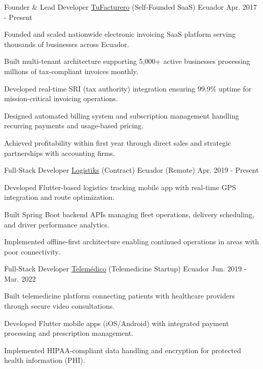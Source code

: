 \begin{cventries}
  \cventry
    {Founder \& Lead Developer} %
    {\href{https://tufacturero.ec}{TuFacturero} (Self-Founded SaaS)} %
    {Ecuador} %
    {Apr. 2017 - Present} %
    {
      \begin{cvitems} %
        \item {Founded and scaled nationwide electronic invoicing SaaS platform serving thousands of businesses across Ecuador.}
        \item {Built multi-tenant architecture supporting 5,000+ active businesses processing millions of tax-compliant invoices monthly.}
        \item {Developed real-time SRI (tax authority) integration ensuring 99.9\% uptime for mission-critical invoicing operations.}
        \item {Designed automated billing system and subscription management handling recurring payments and usage-based pricing.}
        \item {Achieved profitability within first year through direct sales and strategic partnerships with accounting firms.}
      \end{cvitems}
    }

  \cventry
    {Full-Stack Developer} %
    {\href{https://logistiksusa.com/}{Logistiks} (Contract)} %
    {Ecuador (Remote)} %
    {Apr. 2019 - Present} %
    {
      \begin{cvitems} %
        \item {Developed Flutter-based logistics tracking mobile app with real-time GPS integration and route optimization.}
        \item {Built Spring Boot backend APIs managing fleet operations, delivery scheduling, and driver performance analytics.}
        \item {Implemented offline-first architecture enabling continued operations in areas with poor connectivity.}
      \end{cvitems}
    }

  \cventry
    {Full-Stack Developer} %
    {\href{https://telemedico.com.ec/}{Telemédico} (Telemedicine Startup)} %
    {Ecuador} %
    {Jun. 2019 - Mar. 2022} %
    {
      \begin{cvitems} %
        \item {Built telemedicine platform connecting patients with healthcare providers through secure video consultations.}
        \item {Developed Flutter mobile apps (iOS/Android) with integrated payment processing and prescription management.}
        \item {Implemented HIPAA-compliant data handling and encryption for protected health information (PHI).}
      \end{cvitems}
    }


\end{cventries}
